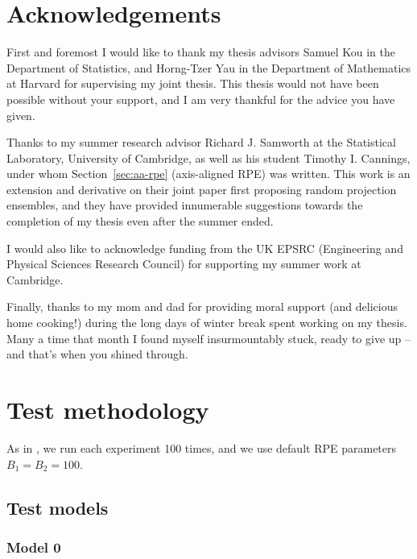 \documentclass{amsart}
\begin{document}
\newpage
\section{Acknowledgements}

First and foremost I would like to thank my thesis advisors Samuel Kou in the Department of Statistics, and Horng-Tzer Yau in the Department of Mathematics at Harvard for supervising my joint thesis. This thesis would not have been possible without your support, and I am very thankful for the advice you have given.

Thanks to my summer research advisor Richard J. Samworth at the Statistical Laboratory, University of Cambridge, as well as his student Timothy I. Cannings, under whom Section~\ref{sec:aa-rpe} (axis-aligned RPE) was written. This work is an extension and derivative on their joint paper first proposing random projection ensembles, and they have provided innumerable suggestions towards the completion of my thesis even after the summer ended.

I would also like to acknowledge funding from the UK EPSRC (Engineering and Physical Sciences Research Council) for supporting my summer work at Cambridge.

Finally, thanks to my mom and dad for providing moral support (and delicious home cooking!) during the long days of winter break spent working on my thesis. Many a time that month I found myself insurmountably stuck, ready to give up -- and that's when you shined through.







\appendix




\newpage
\section{Test methodology}\label{sec:test-models}

As in \cite{CS15}, we run each experiment 100 times, and we use default RPE parameters $B_1=B_2=100$.

\subsection{Test models}

\subsubsection{Model 0}
\end{document}

